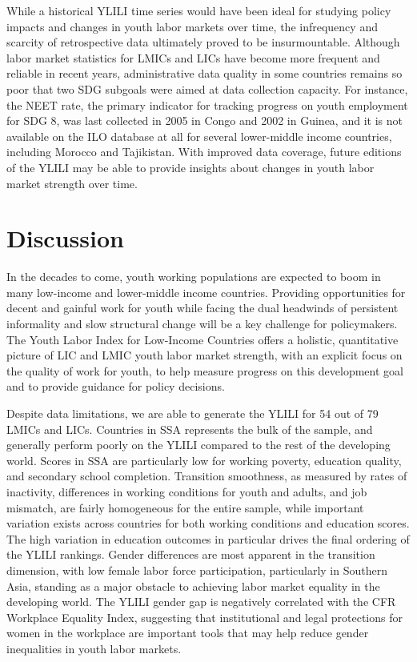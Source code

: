 \documentclass[
  a4paper, twoside, 12pt]{book}
\begin{document}
While a historical YLILI time series would have been ideal for studying policy impacts and changes in youth labor markets over time, the infrequency and scarcity of retrospective data ultimately proved to be insurmountable. Although labor market statistics for LMICs and LICs have become more frequent and reliable in recent years, administrative data quality in some countries remains so poor that two SDG subgoals were aimed at data collection capacity. For instance, the NEET rate, the primary indicator for tracking progress on youth employment for SDG 8, was last collected in 2005 in Congo and 2002 in Guinea, and it is not available on the ILO database at all for several lower-middle income countries, including Morocco and Tajikistan. With improved data coverage, future editions of the YLILI may be able to provide insights about changes in youth labor market strength over time.

\hypertarget{discussion}{%
\section{Discussion}\label{discussion}}

In the decades to come, youth working populations are expected to boom in many low-income and lower-middle income countries. Providing opportunities for decent and gainful work for youth while facing the dual headwinds of persistent informality and slow structural change will be a key challenge for policymakers. The Youth Labor Index for Low-Income Countries offers a holistic, quantitative picture of LIC and LMIC youth labor market strength, with an explicit focus on the quality of work for youth, to help measure progress on this development goal and to provide guidance for policy decisions.

Despite data limitations, we are able to generate the YLILI for 54 out of 79 LMICs and LICs. Countries in SSA represents the bulk of the sample, and generally perform poorly on the YLILI compared to the rest of the developing world. Scores in SSA are particularly low for working poverty, education quality, and secondary school completion. Transition smoothness, as measured by rates of inactivity, differences in working conditions for youth and adults, and job mismatch, are fairly homogeneous for the entire sample, while important variation exists across countries for both working conditions and education scores. The high variation in education outcomes in particular drives the final ordering of the YLILI rankings. Gender differences are most apparent in the transition dimension, with low female labor force participation, particularly in Southern Asia, standing as a major obstacle to achieving labor market equality in the developing world. The YLILI gender gap is negatively correlated with the CFR Workplace Equality Index, suggesting that institutional and legal protections for women in the workplace are important tools that may help reduce gender inequalities in youth labor markets.
\end{document}
